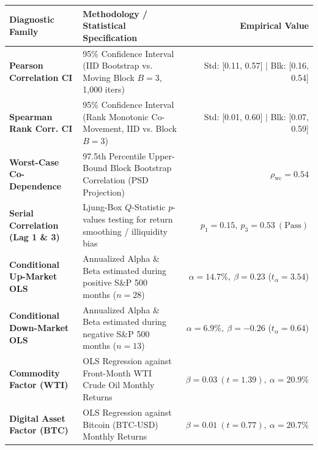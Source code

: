 \documentclass[10pt,a4paper]{article}
\begin{document}
\vspace{0.45em}

\begin{tcolorbox}[colback=white, colframe=primary, title=\textbf{\small\strut Appendix A: Extended Statistical, Bootstrap \& Factor Diagnostics}, fonttitle=\sffamily\bfseries\small, arc=5pt, boxrule=0.8pt, toptitle=4pt, bottomtitle=4pt, left=6pt, right=6pt, top=3.5pt, bottom=3.5pt, colbacktitle=primary]
\renewcommand{\arraystretch}{1.22}
\scriptsize
\begin{tabularx}{\textwidth}{l X r}
\toprule
\textbf{\textcolor{primary}{Diagnostic Family}} & \textbf{\textcolor{primary}{Methodology / Statistical Specification}} & \textbf{\textcolor{primary}{Empirical Value}} \\
\midrule
\textbf{Pearson Correlation CI} & 95\% Confidence Interval (IID Bootstrap vs. Moving Block $B=3$, 1,000 iters) & Std: [0.11, 0.57] $\vert$ Blk: [0.16, 0.54] \\
\rowcolor{cardbg} \textbf{Spearman Rank Corr. CI} & 95\% Confidence Interval (Rank Monotonic Co-Movement, IID vs. Block $B=3$) & Std: [0.01, 0.60] $\vert$ Blk: [0.07, 0.59] \\
\textbf{Worst-Case Co-Dependence} & 97.5th Percentile Upper-Bound Block Bootstrap Correlation (PSD Projection) & $\rho_{\text{wc}} = 0.54$ \\
\rowcolor{cardbg} \textbf{Serial Correlation (Lag 1 \& 3)} & Ljung-Box $Q$-Statistic $p$-values testing for return smoothing / illiquidity bias & $p_1=0.15,\ p_3=0.53\ (\text{Pass})$ \\
\textbf{Conditional Up-Market OLS} & Annualized Alpha \& Beta estimated during positive S\&P 500 months ($n=28$) & $\alpha=14.7\%,\ \beta=0.23$ ($t_\alpha=3.54$) \\
\rowcolor{cardbg} \textbf{Conditional Down-Market OLS} & Annualized Alpha \& Beta estimated during negative S\&P 500 months ($n=13$) & $\alpha=6.9\%,\ \beta=-0.26$ ($t_\alpha=0.64$) \\
\textbf{Commodity Factor (WTI)} & OLS Regression against Front-Month WTI Crude Oil Monthly Returns & $\beta=0.03\ (t=1.39),\ \alpha=20.9\%$ \\
\rowcolor{cardbg} \textbf{Digital Asset Factor (BTC)} & OLS Regression against Bitcoin (BTC-USD) Monthly Returns & $\beta=0.01\ (t=0.77),\ \alpha=20.7\%$ \\
\bottomrule
\end{tabularx}
\end{tcolorbox}
\end{document}
